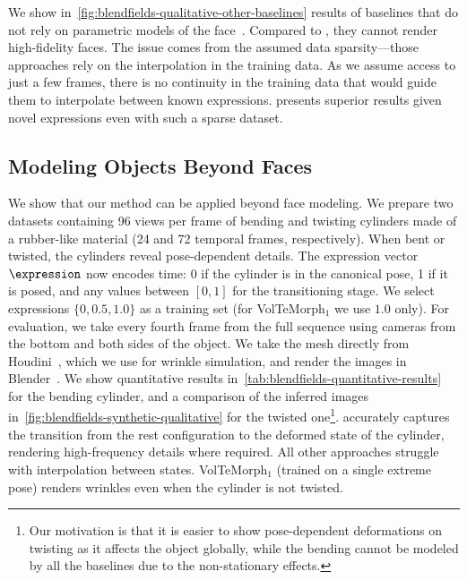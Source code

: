     

    We show in~\cref{fig:blendfields-qualitative-other-baselines} results of
    baselines that do not rely on parametric models of the
    face~\cite{li2017flame}.
    Compared to \blendfields, they cannot render high-fidelity faces.
    The issue comes from the assumed data sparsity---those approaches rely on the
    interpolation in the training data.
    As we assume access to just a few frames, there is no continuity in the
    training data that would guide them to interpolate between known expressions.
    \blendfields presents superior results given novel expressions even with such a sparse dataset.

    
    

  \subsection{Modeling Objects Beyond Faces}
    We show that our method can be applied beyond face modeling.
    We prepare two datasets containing 96 views per frame of bending and twisting
    cylinders made of a rubber-like material (24 and 72 temporal frames,
    respectively).
    When bent or twisted, the cylinders reveal pose-dependent details.
    The expression vector $\expression$ now encodes time: 0 if the cylinder is in
    the canonical pose, 1 if it is posed, and any values between $[0, 1]$ for the
    transitioning stage.
    We select expressions $\{0, 0.5, 1.0\}$ as a training set (for VolTeMorph$_1$
    we use $1.0$ only).
    For evaluation, we take every fourth frame from the full sequence using
    cameras from the bottom and both sides of the object.
    We take the mesh directly from Houdini~\cite{xu2014houdini}, which we use for
    wrinkle simulation, and render the images in Blender~\cite{blender2022}.
    We show quantitative results in~\cref{tab:blendfields-quantitative-results}
    for the bending cylinder, and a comparison of the inferred images
    in~\cref{fig:blendfields-synthetic-qualitative} for the twisted
    one\footnote{Our motivation is that it is easier to show pose-dependent
      deformations on twisting as it affects the object globally, while the bending
      cannot be modeled by all the baselines due to the non-stationary effects.
    }. \blendfields accurately captures the transition from the rest configuration to the deformed state of the cylinder, rendering high-frequency details where required.
    All other approaches struggle with interpolation between states.
    VolTeMorph$_1$ (trained on a single extreme pose) renders wrinkles even when
    the cylinder is not twisted.

